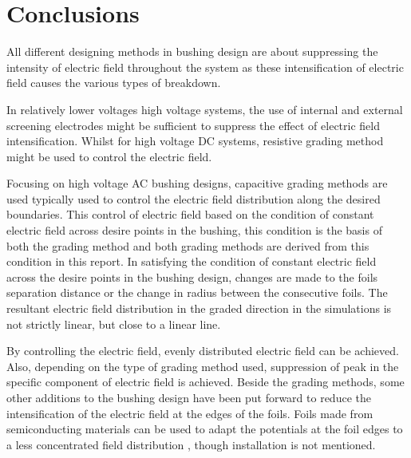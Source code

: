 \section{Conclusions}
All different designing methods in bushing design are about suppressing the intensity of electric field throughout the system as these intensification of electric field causes the various types of breakdown.

 In relatively lower voltages high voltage systems, the use of internal and external screening electrodes might be sufficient to suppress the effect of electric field intensification. Whilst for high voltage DC systems, resistive grading method might be used to control the electric field.

Focusing on high voltage AC bushing designs, capacitive grading methods are used typically used to control the electric field distribution along the desired boundaries. This control of electric field based on the condition of constant electric field across desire points in the bushing, this condition is the basis of both the grading method and both grading methods are derived from this condition in this report. In satisfying the condition of constant electric field across the desire points in the bushing design, changes are made to the foils separation distance or the change in radius between the consecutive foils. The resultant electric field distribution in the graded direction in the simulations is not strictly linear, but close to a linear line.

By controlling the electric field, evenly distributed electric field can be achieved. Also, depending on the type of grading method used, suppression of peak in the specific component of electric field is achieved. Beside the grading methods, some other additions to the bushing design have been put forward to reduce the intensification of the electric field at the edges of the foils. Foils made from semiconducting materials can be used to adapt the potentials at the foil edges to a less concentrated field distribution \cite{kuffel2000high}, though installation is not mentioned. 

